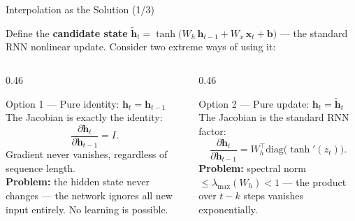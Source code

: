 \documentclass[aspectratio=169]{beamer}
\begin{document}
\begin{frame}{Interpolation as the Solution (1/3)}

Define the \textbf{candidate state}
$\tilde{\boldsymbol{h}}_t = \tanh\!\bigl(W_h\,\boldsymbol{h}_{t-1} + W_x\,\boldsymbol{x}_t + \boldsymbol{b}\bigr)$
— the standard RNN nonlinear update. Consider two extreme ways of using it:

\bigskip
\begin{columns}[T]

  \begin{column}{0.46\textwidth}
    \begin{block}{Option 1 — Pure identity: $\boldsymbol{h}_t = \boldsymbol{h}_{t-1}$}
      The Jacobian is exactly the identity:
      \[
        \frac{\partial \boldsymbol{h}_t}{\partial \boldsymbol{h}_{t-1}} = I.
      \]
      Gradient never vanishes, regardless of sequence length.\\[4pt]
      \textbf{Problem:} the hidden state never changes — the network
      ignores all new input entirely. No learning is possible.
    \end{block}
  \end{column}

  \begin{column}{0.46\textwidth}
    \begin{alertblock}{Option 2 — Pure update: $\boldsymbol{h}_t = \tilde{\boldsymbol{h}}_t$}
      The Jacobian is the standard RNN factor:
      \[
        \frac{\partial \boldsymbol{h}_t}{\partial \boldsymbol{h}_{t-1}}
        = W_h^{\top}\mathrm{diag}\!\bigl(\tanh'(z_t)\bigr).
      \]
      \textbf{Problem:} spectral norm $\leq \lambda_{\max}(W_h) < 1$
      — the product over $t-k$ steps vanishes exponentially.
    \end{alertblock}
  \end{column}

\end{columns}

\end{frame}
%
%
\end{document}

